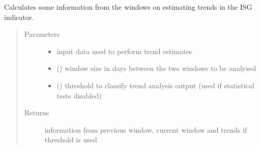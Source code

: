 \documentclass[letterpaper,10pt,english]{sphinxmanual}
\begin{document}
\begin{fulllineitems}
\label{\detokenize{algorithms:algorithms.eti.eti.calc_info_windows_isg}}
\sphinxAtStartPar
Calculates some information from the windows on estimating trends in the ISG indicator.
\begin{quote}\begin{description}
\item[{Parameters}] \leavevmode\begin{itemize}
\item {} 
\sphinxAtStartPar
{} \textendash{} input data used to perform trend estimates

\item {} 
\sphinxAtStartPar
{} () \textendash{} window size in days between the two windows to be analyzed

\item {} 
\sphinxAtStartPar
{} () \textendash{} threshold to classify trend analysis output (used if statistical tests disabled)

\end{itemize}

\item[{Returns}] \leavevmode
\sphinxAtStartPar
information from previous window, current window and trends if threshold is used

\end{description}\end{quote}

\end{fulllineitems}

\end{document}
